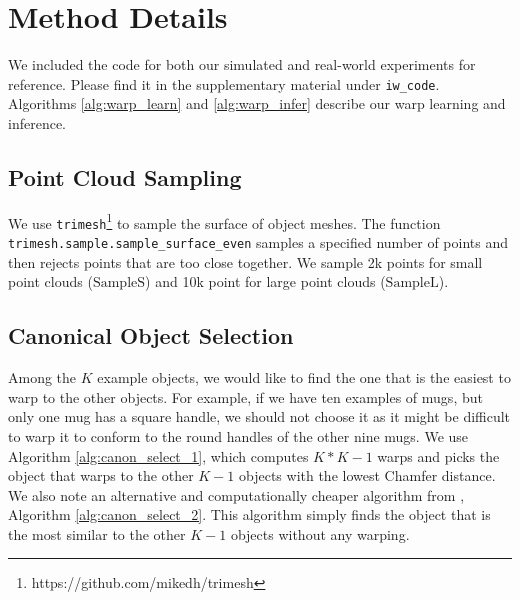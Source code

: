 \documentclass{article}
\begin{document}
\clearpage
\appendix

\section{Method Details}
\label{appendix:method}

We included the code for both our simulated and real-world experiments for reference. Please find it in the supplementary material under \texttt{iw\_code}. Algorithms \ref{alg:warp_learn} and \ref{alg:warp_infer} describe our warp learning and inference.




\subsection{Point Cloud Sampling}
\label{appendix:method:sampling}

We use \texttt{trimesh}\footnote{https://github.com/mikedh/trimesh} to sample the surface of object meshes. The function \texttt{trimesh.sample.sample\_surface\_even} samples a specified number of points and then rejects points that are too close together. We sample 2k points for small point clouds ($\mathrm{SampleS}$) and 10k point for large point clouds ($\mathrm{SampleL}$).

\subsection{Canonical Object Selection}
\label{appendix:method:canonical}

Among the $K$ example objects, we would like to find the one that is the easiest to warp to the other objects. For example, if we have ten examples of mugs, but only one mug has a square handle, we should not choose it as it might be difficult to warp it to conform to the round handles of the other nine mugs. We use Algorithm \ref{alg:canon_select_1}, which computes $K * K-1$ warps and picks the object that warps to the other $K-1$ objects with the lowest Chamfer distance. We also note an alternative and computationally cheaper algorithm from \citet{thompson21shapebased}, Algorithm \ref{alg:canon_select_2}. This algorithm simply finds the object that is the most similar to the other $K-1$ objects without any warping.
\end{document}
